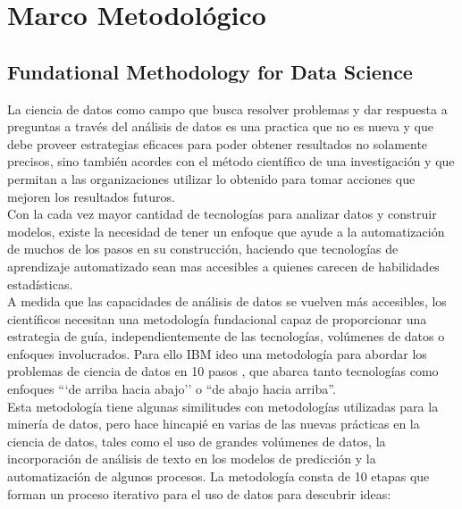 

\chapter{Marco Metodológico}

\section{Fundational Methodology for Data Science}

La ciencia de datos como campo que busca resolver problemas y dar respuesta a preguntas a través del análisis de datos es una practica que no es nueva y que debe proveer estrategias eficaces para poder obtener resultados no solamente precisos, sino también acordes con el método científico de una investigación y que permitan a las organizaciones utilizar lo obtenido para tomar acciones que mejoren los resultados futuros.\\

Con la cada vez mayor cantidad de tecnologías para analizar datos y construir modelos, existe la necesidad de tener un enfoque que ayude a la automatización de muchos de los pasos en su construcción, haciendo que tecnologías de aprendizaje automatizado sean mas accesibles a quienes carecen de habilidades estadísticas.\\

A medida que las capacidades de análisis de datos se vuelven más accesibles, los científicos necesitan una metodología fundacional capaz de proporcionar una estrategia de guía, independientemente de las tecnologías, volúmenes de datos o enfoques involucrados. Para ello IBM ideo una metodología para abordar los problemas de ciencia de datos en 10 pasos , que abarca tanto tecnologías como enfoques ```de arriba hacia abajo'' o  ``de abajo hacia arriba''.\\

Esta metodología tiene algunas similitudes con metodologías utilizadas para la minería de datos, pero hace hincapié en varias de las nuevas prácticas en la ciencia de datos, tales como el uso de grandes volúmenes de datos, la incorporación de análisis de texto en los modelos de predicción y la automatización de algunos procesos.\cite{ibmfmfds} La metodología consta de 10 etapas que forman un proceso iterativo para el uso de datos para descubrir ideas:

